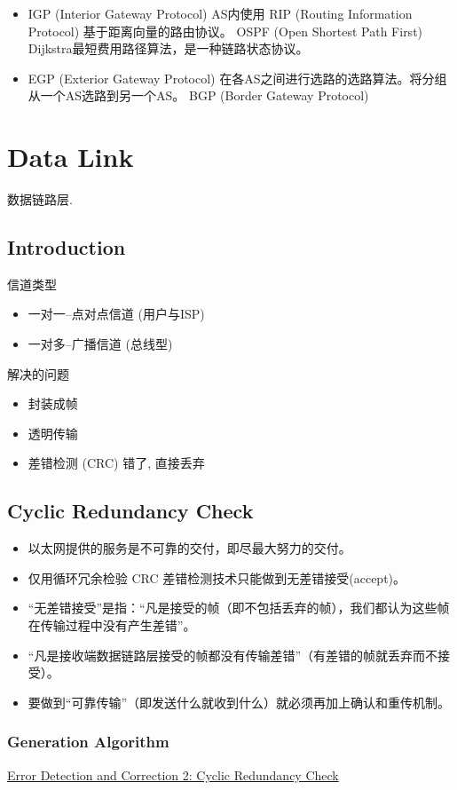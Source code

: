 \documentclass[a4paper]{report}
\begin{document}
\begin{itemize}
  \item IGP (Interior Gateway Protocol) AS内使用
  \subitem RIP (Routing Information Protocol) 基于距离向量的路由协议。
  \subitem OSPF (Open Shortest Path First) Dijkstra最短费用路径算法，是一种链路状态协议。
  \item EGP (Exterior Gateway Protocol) 在各AS之间进行选路的选路算法。将分组从一个AS选路到另一个AS。
  \subitem BGP (Border Gateway Protocol)
\end{itemize}

\chapter{Data Link}
数据链路层. 
\section{Introduction}
信道类型
\begin{itemize}
  \item 一对一--点对点信道 (用户与ISP) 
  \item 一对多--广播信道 (总线型)
\end{itemize}
解决的问题
\begin{itemize}
  \item 封装成帧
  \item 透明传输 
  \item 差错检测 (CRC) 错了, 直接丢弃
\end{itemize}

\section{Cyclic Redundancy Check}
\begin{itemize}
  \item 以太网提供的服务是不可靠的交付，即尽最大努力的交付。
  \item 仅用循环冗余检验 CRC 差错检测技术只能做到无差错接受(accept)。
  \item “无差错接受”是指：“凡是接受的帧（即不包括丢弃的帧），我们都认为这些帧在传输过程中没有产生差错”。
  \item “凡是接收端数据链路层接受的帧都没有传输差错”（有差错的帧就丢弃而不接受）。
  \item 要做到“可靠传输”（即发送什么就收到什么）就必须再加上确认和重传机制。  
\end{itemize}
\subsection{Generation Algorithm}
\href{https://www.youtube.com/watch?v=6gbkoFciryA}{Error Detection and Correction 2: Cyclic Redundancy Check}
\end{document}
